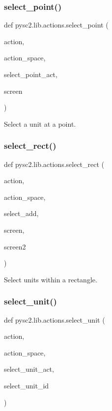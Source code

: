 \subsubsection{\texorpdfstring{select\+\_\+point()}{select\_point()}}
{\footnotesize\ttfamily def pysc2.\+lib.\+actions.\+select\+\_\+point (\begin{DoxyParamCaption}\item[{}]{action,  }\item[{}]{action\+\_\+space,  }\item[{}]{select\+\_\+point\+\_\+act,  }\item[{}]{screen }\end{DoxyParamCaption})}

\begin{DoxyVerb}Select a unit at a point.\end{DoxyVerb}
 \mbox{\label{namespacepysc2_1_1lib_1_1actions_afab1681a2cd67f4f272640e32ccf9e0b}} 
\subsubsection{\texorpdfstring{select\+\_\+rect()}{select\_rect()}}
{\footnotesize\ttfamily def pysc2.\+lib.\+actions.\+select\+\_\+rect (\begin{DoxyParamCaption}\item[{}]{action,  }\item[{}]{action\+\_\+space,  }\item[{}]{select\+\_\+add,  }\item[{}]{screen,  }\item[{}]{screen2 }\end{DoxyParamCaption})}

\begin{DoxyVerb}Select units within a rectangle.\end{DoxyVerb}
 \mbox{\label{namespacepysc2_1_1lib_1_1actions_a978d483e32717353b683dfa14b5e7ff9}} 
\subsubsection{\texorpdfstring{select\+\_\+unit()}{select\_unit()}}
{\footnotesize\ttfamily def pysc2.\+lib.\+actions.\+select\+\_\+unit (\begin{DoxyParamCaption}\item[{}]{action,  }\item[{}]{action\+\_\+space,  }\item[{}]{select\+\_\+unit\+\_\+act,  }\item[{}]{select\+\_\+unit\+\_\+id }\end{DoxyParamCaption})}

